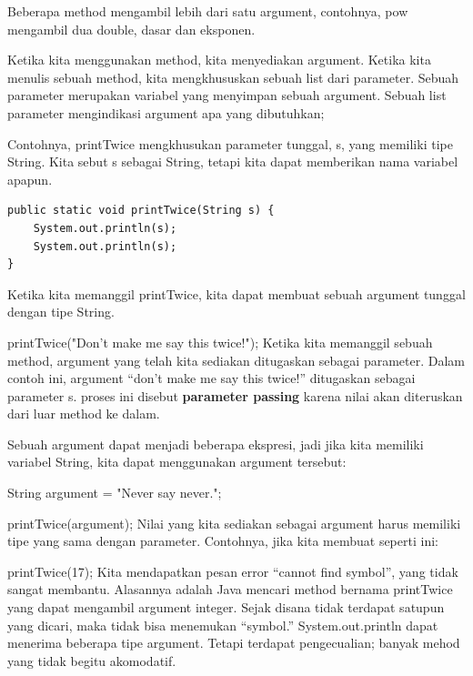 Beberapa method mengambil lebih dari satu argument, contohnya, pow mengambil dua double, dasar dan eksponen.

Ketika kita menggunakan method, kita menyediakan argument. Ketika kita menulis sebuah method, kita mengkhususkan sebuah list dari parameter. Sebuah parameter merupakan variabel yang menyimpan sebuah argument. Sebuah list parameter mengindikasi argument apa yang dibutuhkan;

Contohnya, printTwice mengkhusukan parameter tunggal, s, yang memiliki tipe String. Kita sebut s sebagai String, tetapi kita dapat memberikan nama variabel apapun.
\begin{lstlisting}
public static void printTwice(String s) {
	System.out.println(s);
	System.out.println(s);
}
\end{lstlisting}
Ketika kita memanggil printTwice, kita dapat membuat sebuah argument tunggal dengan tipe String.\newline

	printTwice("Don't make me say this twice!");\newline\newline
Ketika kita memanggil sebuah method, argument yang telah kita sediakan ditugaskan sebagai parameter. Dalam contoh ini, argument “don’t make me say this twice!” ditugaskan sebagai parameter s. proses ini disebut \textbf {parameter passing}  karena nilai akan diteruskan dari luar method ke dalam.

Sebuah argument dapat menjadi beberapa ekspresi, jadi jika kita memiliki variabel String, kita dapat menggunakan argument tersebut:\newline

	String argument = "Never say never.";

	printTwice(argument);\newline \newline
 Nilai yang kita sediakan sebagai argument harus memiliki tipe yang sama dengan parameter. Contohnya, jika kita membuat seperti ini:\newline
	
	printTwice(17);\newline \newline
Kita mendapatkan pesan error “cannot find symbol”, yang tidak sangat membantu. Alasannya adalah Java mencari method bernama printTwice yang dapat mengambil argument integer. Sejak disana tidak terdapat satupun yang dicari, maka tidak bisa menemukan “symbol.” 
\newline
\newline
System.out.println dapat menerima beberapa tipe argument. Tetapi terdapat pengecualian; banyak mehod yang tidak begitu akomodatif.

